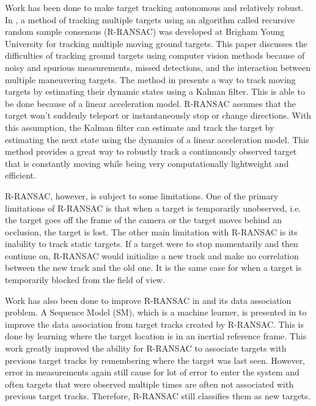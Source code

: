 \documentclass[letterpaper, 10 pt, conference]{ieeeconf}  %
\begin{document}
Work has been done to make target tracking autonomous and relatively robust. In \cite{niedfeldt2014multiple}, a method of tracking multiple targets using an algorithm called recursive random sample consensus (R-RANSAC) was developed at Brigham Young University for tracking multiple moving ground targets. This paper discusses the difficulties of tracking ground targets using computer vision methods because of noisy and spurious measurements, missed detections, and the interaction between multiple maneuvering targets. The method in \cite{niedfeldt2014multiple} presents a way to track moving targets by estimating their dynamic states using a Kalman filter. This is able to be done because of a linear acceleration model. R-RANSAC assumes that the target won't suddenly teleport or instantaneously stop or change directions. With this assumption, the Kalman filter can estimate and track the target by estimating the next state using the dynamics of a linear acceleration model. This method provides a great way to robustly track a continuously observed target that is constantly moving while being very computationally lightweight and efficient.

R-RANSAC, however, is subject to some limitations. One of the primary limitations of R-RANSAC is that when a target is temporarily unobserved, i.e. the target goes off the frame of the camera or the target moves behind an occlusion, the target is lost. The other main limitation with R-RANSAC is its inability to track static targets. If a target were to stop momentarily and then continue on, R-RANSAC would initialize a new track and make no correlation between the new track and the old one. It is the same case for when a target is temporarily blocked from the field of view.

Work has also been done to improve R-RANSAC in \cite{ingersoll2015vision} and its data association problem. A Sequence Model (SM), which is a machine learner, is presented in \cite{ingersoll2015vision} to improve the data association from target tracks created by R-RANSAC. This is done by learning where the target location is in an inertial reference frame. This work greatly improved the ability for R-RANSAC to associate targets with previous target tracks by remembering where the target was last seen. However, error in measurements again still cause for lot of error to enter the system and often targets that were observed multiple times are often not associated with previous target tracks. Therefore, R-RANSAC still classifies them as new targets. 
\end{document}
